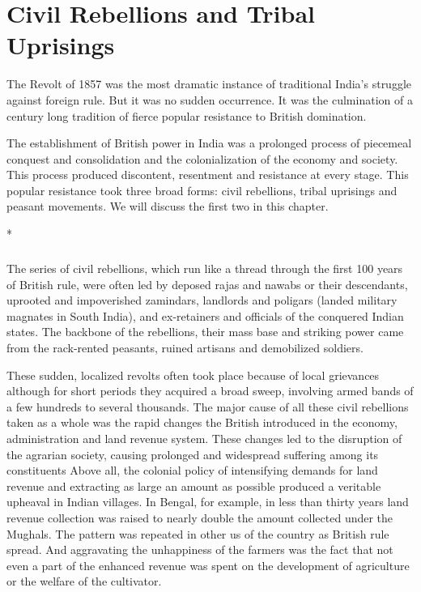 
\chapter{Civil Rebellions and Tribal Uprisings}

The Revolt of 1857 was the most dramatic instance of traditional India's struggle against foreign rule. But it was no sudden occurrence. It was the culmination of a century long tradition of fierce popular resistance to British domination.

The establishment of British power in India was a prolonged process of piecemeal conquest and consolidation and the colonialization of the economy and society. This process produced discontent, resentment and resistance at every stage. This popular resistance took three broad forms: civil rebellions, tribal uprisings and peasant movements. We will discuss the first two in this chapter.

\begin{center}*\end{center}

\paragraph*{}
The series of civil rebellions, which run like a thread through the first 100 years of British rule, were often led by deposed rajas and nawabs or their descendants, uprooted and impoverished zamindars, landlords and poligars (landed military magnates in South India), and ex-retainers and officials of the conquered Indian states. The backbone of the rebellions, their mass base and striking power came from the rack-rented peasants, ruined artisans and demobilized soldiers.

These sudden, localized revolts often took place because of local grievances although for short periods they acquired a broad sweep, involving armed bands of a few hundreds to several thousands. The major cause of all these civil rebellions taken as a whole was the rapid changes the British introduced in the economy, administration and land revenue system. These changes led to the disruption of the agrarian society, causing prolonged and widespread suffering among its constituents Above all, the colonial policy of intensifying demands for land revenue and extracting as large an amount as possible produced a veritable upheaval in Indian villages. In Bengal, for example, in less than thirty years land revenue collection was raised to nearly double the amount collected under the Mughals. The pattern was repeated in other us of the country as British rule spread. And aggravating the unhappiness of the farmers was the fact that not even a part of the enhanced revenue was spent on the development of agriculture or the welfare of the cultivator.

